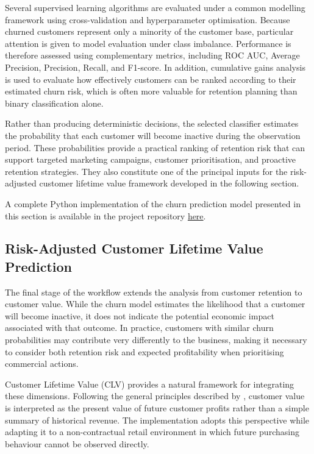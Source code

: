 \documentclass[
  12pt,
  letterpaper,
]{book}
\begin{document}
Several supervised learning algorithms are evaluated under a common
modelling framework using cross-validation and hyperparameter
optimisation. Because churned customers represent only a minority of the
customer base, particular attention is given to model evaluation under
class imbalance. Performance is therefore assessed using complementary
metrics, including ROC AUC, Average Precision, Precision, Recall, and
F1-score. In addition, cumulative gains analysis is used to evaluate how
effectively customers can be ranked according to their estimated churn
risk, which is often more valuable for retention planning than binary
classification alone.

Rather than producing deterministic decisions, the selected classifier
estimates the probability that each customer will become inactive during
the observation period. These probabilities provide a practical ranking
of retention risk that can support targeted marketing campaigns,
customer prioritisation, and proactive retention strategies. They also
constitute one of the principal inputs for the risk-adjusted customer
lifetime value framework developed in the following section.

A complete Python implementation of the churn prediction model presented
in this section is available in the project repository
\href{https://github.com/rodrigokang/portfolio/tree/main/notebooks-and-scripts/2-retail-analytics/2-customer-value-and-retention}{here}.

\subsection{Risk-Adjusted Customer Lifetime Value
Prediction}\label{risk-adjusted-customer-lifetime-value-prediction}

The final stage of the workflow extends the analysis from customer
retention to customer value. While the churn model estimates the
likelihood that a customer will become inactive, it does not indicate
the potential economic impact associated with that outcome. In practice,
customers with similar churn probabilities may contribute very
differently to the business, making it necessary to consider both
retention risk and expected profitability when prioritising commercial
actions.

Customer Lifetime Value (CLV) provides a natural framework for
integrating these dimensions. Following the general principles described
by , customer value is
interpreted as the present value of future customer profits rather than
a simple summary of historical revenue. The implementation adopts this
perspective while adapting it to a non-contractual retail environment in
which future purchasing behaviour cannot be observed directly.
\end{document}
